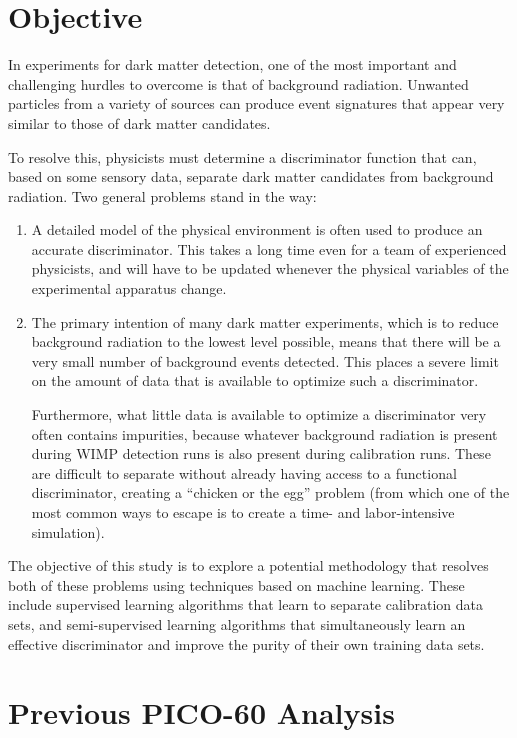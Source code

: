 \documentclass[10pt]{article}
\begin{document}
\section{Objective}

In experiments for dark matter detection, one of the most important and challenging hurdles to overcome is that of background radiation. Unwanted particles from a variety of sources can produce event signatures that appear very similar to those of dark matter candidates.

To resolve this, physicists must determine a discriminator function that can, based on some sensory data, separate dark matter candidates from background radiation. Two general problems stand in the way:

\begin{enumerate}
    \item A detailed model of the physical environment is often used to produce an accurate discriminator. This takes a long time even for a team of experienced physicists, and will have to be updated whenever the physical variables of the experimental apparatus change.

    \item The primary intention of many dark matter experiments, which is to reduce background radiation to the lowest level possible, means that there will be a very small number of background events detected. This places a severe limit on the amount of data that is available to optimize such a discriminator.

    Furthermore, what little data is available to optimize a discriminator very often contains impurities, because whatever background radiation is present during WIMP detection runs is also present during calibration runs. These are difficult to separate without already having access to a functional discriminator, creating a ``chicken or the egg'' problem (from which one of the most common ways to escape is to create a time- and labor-intensive simulation).
\end{enumerate}

The objective of this study is to explore a potential methodology that resolves both of these problems using techniques based on machine learning. These include supervised learning algorithms that learn to separate calibration data sets, and semi-supervised learning algorithms that simultaneously learn an effective discriminator and improve the purity of their own training data sets.

\section{Previous PICO-60 Analysis}
\end{document}
